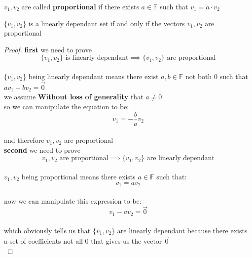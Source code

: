 \documentclass[a4paper,12pt]{article}
\begin{document}
\begin{definition}
\(v_1, v_2\) are called \textbf{proportional} if there exists \(a \in \mathbb{F}\) such that \(v_1 = a \cdot v_2\)\\

\begin{lemma}
\(\{v_1, v_2\}\) is a linearly dependant set if and only if the vectors \(v_1,v_2\) are proportional\\
\begin{proof}
\textbf{first} we need to prove\\
\[
  \{v_1, v_2\} \text{ is linearly dependant} \implies \{v_1, v_2\} \text{ are proportional}
\]\\
\(\{v_1, v_2\}\) being linearly dependant means there exist \(a,b \in \mathbb{F}\) not both 0 such that \(av_1 + bv_2 = \vec0\)\\
we assume \textbf{Without loss of generality} that \(a \neq 0\)\\
so we can manipulate the equation to be:\\
\[
  v_1 = -\dfrac{b}{a}v_2
\]\\
and therefore \(v_1,v_2\) are proportional\\
\textbf{second} we need to prove\\
\[
  v_1, v_2 \text{ are proportional} \implies \{v_1, v_2\} \text{ are linearly dependant}
\]\\
\(v_1, v_2\) being proportional means there exists \(a \in \mathbb{F}\) such that:\\
\[
  v_1 = av_2
\]\\
now we can manipulate this expression to be:\\
\[
  v_1 - av_2 = \vec0
\]\\
which obviously tells us that \(\{v_1,v_2\}\) are linearly dependant because there exists a set of coefficients not all 0 that gives us the vector \(\vec0\)\\
\end{proof}
\end{lemma}


\end{definition}
\end{document}
